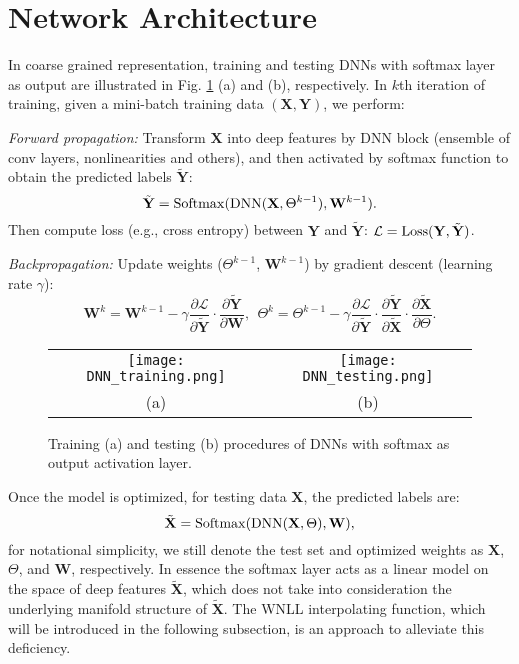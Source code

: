 \documentclass{article}
\begin{document}
\section{Network Architecture}
\label{sec:Network-Architecture}
In coarse grained representation, training and testing DNNs with softmax layer as output are illustrated in Fig. \ref{fig:DNN-Structure} (a) and (b), respectively. In $k$th iteration of training, given a mini-batch training data $(\mathbf{X}, \mathbf{Y})$, we perform:

{\it Forward propagation:} Transform $\mathbf{X}$ into deep features by DNN block (ensemble of conv layers, nonlinearities and others), and then activated by softmax function to obtain the predicted labels $\tilde{\mathbf{Y}}$:
$$
\tilde{\mathbf{Y}} = {\rm Softmax}({\rm DNN}(\mathbf{X}, \Theta^{k-1}), \mathbf{W}^{k-1}).
$$
Then compute loss (e.g., cross entropy) between $\mathbf{Y}$ and $\tilde{\mathbf{Y}}$:
$\mathcal{L} = {\rm Loss}(\mathbf{Y}, \tilde{\mathbf{Y}})$.

{\it Backpropagation:} Update weights ($\Theta^{k-1}$, $\mathbf{W}^{k-1}$) by gradient descent (learning rate $\gamma$):
$$\mathbf{W}^{k} = \mathbf{W}^{k-1} - \gamma \frac{\partial \mathcal{L}}{\partial \tilde{\mathbf{Y}}}\cdot \frac{\partial \tilde{\mathbf{Y}}}{\partial \mathbf{W}}, \ \ \Theta^{k} = \Theta^{k-1} - \gamma \frac{\partial \mathcal{L}}{\partial \tilde{\mathbf{Y}}}\cdot \frac{\partial \tilde{\mathbf{Y}}}{\partial \tilde{\mathbf{X}}}\cdot \frac{\partial \tilde{\mathbf{X}}}{\partial \Theta}.$$


\begin{figure}[h]
\centering
\begin{tabular}{cc}
\texttt{[image: DNN\_training.png]}&
\texttt{[image: DNN\_testing.png]}\\
(a)&(b)\\
\end{tabular}
\caption{Training (a) and testing (b) procedures of DNNs with softmax as output activation layer.}
\label{fig:DNN-Structure}
\end{figure}

Once the model is optimized, for testing data $\mathbf{X}$, the predicted labels are:
$$
\tilde{\mathbf{X}} = {\rm Softmax}({\rm DNN}(\mathbf{X}, \Theta), \mathbf{W}),
$$
for notational simplicity, we still denote the test set and optimized weights as $\mathbf{X}$, $\Theta$, and $\mathbf{W}$, respectively.
In essence the softmax layer acts as a linear model on the space of deep features $\tilde{\mathbf{X}}$, which does not take into consideration the underlying manifold structure of $\tilde{\mathbf{X}}$. The WNLL interpolating function, which will be introduced in the following subsection, is an approach to alleviate this deficiency.
\end{document}
